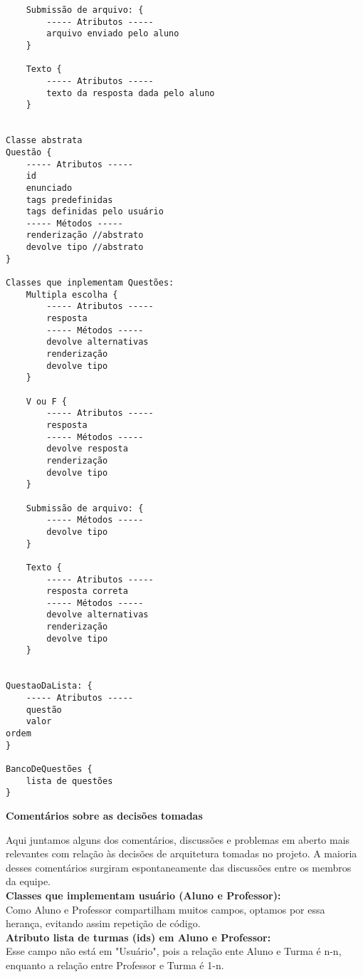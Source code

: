 \documentclass[12pt,letterpaper]{article}
\begin{document}
\begin{verbatim}
    Submissão de arquivo: {
        ----- Atributos -----
        arquivo enviado pelo aluno
    }

    Texto {
        ----- Atributos -----
        texto da resposta dada pelo aluno
    }


Classe abstrata
Questão {
    ----- Atributos -----
    id 
    enunciado 
    tags predefinidas
    tags definidas pelo usuário
    ----- Métodos ----- 
    renderização //abstrato
    devolve tipo //abstrato
}

Classes que inplementam Questões:
    Multipla escolha {
        ----- Atributos -----
        resposta
        ----- Métodos -----
        devolve alternativas
        renderização
        devolve tipo
    }

    V ou F {
        ----- Atributos -----
        resposta
        ----- Métodos -----
        devolve resposta
        renderização
        devolve tipo
    }

    Submissão de arquivo: {
        ----- Métodos -----
        devolve tipo
    }

    Texto {
        ----- Atributos -----
        resposta correta
        ----- Métodos -----
        devolve alternativas
        renderização
        devolve tipo
    }


QuestaoDaLista: {
    ----- Atributos -----
    questão
    valor
ordem
}

BancoDeQuestões {
    lista de questões
}

\end{verbatim}

\pagebreak

\vspace{1cm}
{\large {\bf Comentários sobre as decisões tomadas}}
\vspace{0.5cm}

Aqui juntamos alguns dos comentários, discussões e problemas em aberto mais relevantes com relação às decisões de arquitetura tomadas no projeto. A maioria desses comentários surgiram espontaneamente das discussões entre os membros da equipe.\\

\textbf{Classes que implementam usuário (Aluno e Professor):}\\
Como Aluno e Professor compartilham muitos campos, optamos por essa herança, evitando assim repetição de código.\\

\textbf{Atributo lista de turmas (ids) em Aluno e Professor:}\\
Esse campo não está em "Usuário", pois a relação ente Aluno e Turma é n-n, enquanto a relação entre Professor e Turma é 1-n.\\
\end{document}
